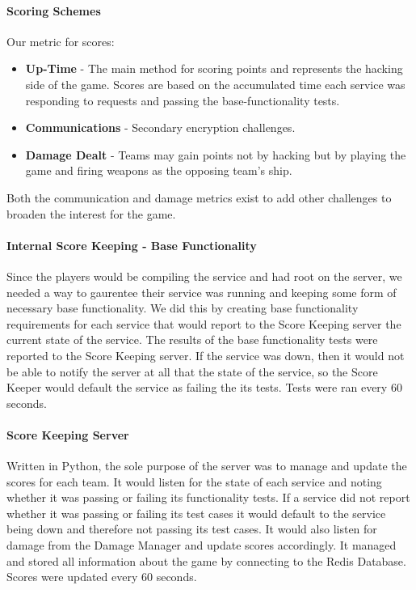 \documentclass[10pt]{article}
\begin{document}
\paragraph*{Scoring Schemes} Our metric for scores:
\begin{itemize}
  \item \textbf{Up-Time} - The main method for scoring points and
  represents the hacking side of the game. Scores are based on the accumulated
  time each service was responding to requests and passing the base-functionality tests. 
  \item \textbf{Communications} - Secondary encryption challenges.
  \item \textbf{Damage Dealt} - Teams may gain points not by hacking but by
  playing the game and firing weapons as the opposing team's ship.
\end{itemize}

Both the communication and damage metrics exist to add other challenges to
broaden the interest for the game.

\paragraph*{Internal Score Keeping - Base Functionality}
Since the players would be compiling the service and had root on the server, we
needed a way to gaurentee their service was running and keeping some form of
necessary base functionality. We did this by creating base functionality 
requirements for each service that would report to the Score Keeping server the 
current state of the service. The results of the base functionality tests were reported
to the Score Keeping server. If the service was down, then it would not be able to 
notify the server at all that the state of the service, so the Score Keeper 
would default the service as failing the its tests. Tests were ran every 60 seconds.

\paragraph*{Score Keeping Server}
Written in Python, the sole purpose of the server was to manage and update the
scores for each team. It would listen for the state of each service and noting
whether it was passing or failing its functionality tests. If a service
did not report whether it was passing or failing its test cases it would
default to the service being down and therefore not passing its test cases.
It would also listen for damage from the Damage Manager and update scores
accordingly. It managed and stored all information about the game by
connecting to the Redis Database. Scores were updated every 60 seconds.
\end{document}
